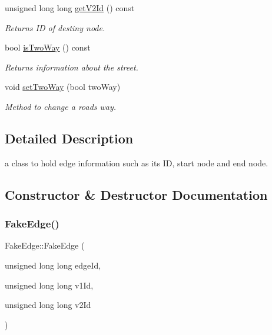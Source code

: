 \begin{DoxyCompactItemize}
\hypertarget{class_fake_edge_adcf7d88217f1b4b55842da1b23fb4f82}{}\label{class_fake_edge_adcf7d88217f1b4b55842da1b23fb4f82} 
unsigned long long \hyperlink{class_fake_edge_adcf7d88217f1b4b55842da1b23fb4f82}{get\+V2\+Id} () const
\begin{DoxyCompactList}\small\item\em Returns ID of destiny node. \end{DoxyCompactList}\item 
bool \hyperlink{class_fake_edge_afce4358d8d47e71b5fb4cbae870b0610}{is\+Two\+Way} () const
\begin{DoxyCompactList}\small\item\em Returns information about the street. \end{DoxyCompactList}\item 
\hypertarget{class_fake_edge_a449009fb7340583ec0aeefdc77ce2303}{}\label{class_fake_edge_a449009fb7340583ec0aeefdc77ce2303} 
void \hyperlink{class_fake_edge_a449009fb7340583ec0aeefdc77ce2303}{set\+Two\+Way} (bool two\+Way)
\begin{DoxyCompactList}\small\item\em Method to change a roads way. \end{DoxyCompactList}\end{DoxyCompactItemize}


\subsection{Detailed Description}
a class to hold edge information such as it\textquotesingle{}s ID, start node and end node. 

\subsection{Constructor \& Destructor Documentation}
\hypertarget{class_fake_edge_a6a68d323de9a406e367dc02e4e20c926}{}\label{class_fake_edge_a6a68d323de9a406e367dc02e4e20c926} 
\subsubsection{\texorpdfstring{Fake\+Edge()}{FakeEdge()}}
{\footnotesize\ttfamily Fake\+Edge\+::\+Fake\+Edge (\begin{DoxyParamCaption}\item[{unsigned long long}]{edge\+Id,  }\item[{unsigned long long}]{v1\+Id,  }\item[{unsigned long long}]{v2\+Id }\end{DoxyParamCaption})}



